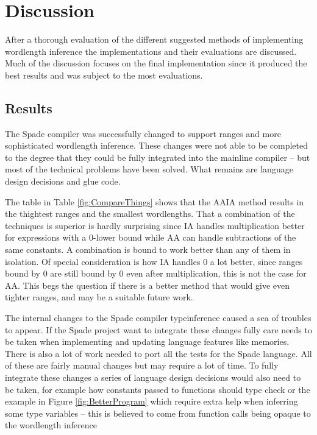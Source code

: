 \chapter{Discussion}
\label{cha:Discussion}
After a thorough evaluation of the different suggested methods of implementing wordlength inference the implementations and their evaluations are discussed. Much of the discussion focuses on the final implementation since it produced the best results and was subject to the most evaluations.

\section{Results}
The Spade compiler was successfully changed to support ranges and more sophisticated wordlength inference. These changes were not able to be completed to the degree that they could be fully integrated into the mainline compiler -- but most of the technical problems have been solved. What remains are language design decisions and glue code.

The table in Table \ref{fig:CompareThings} shows that the AAIA method results in the thightest ranges and the smallest wordlengths. That a combination of the techniques is superior is hardly surprising since IA handles multiplication better for expressions with a 0-lower bound while AA can handle subtractions of the same constants. A combination is bound to work better than any of them in isolation. Of special consideration is how IA handles $0$ a lot better, since ranges bound by 0 are still bound by $0$ even after multiplication, this is not the case for AA. This begs the question if there is a better method that would give even tighter ranges, and may be a suitable future work.

The internal changes to the Spade compiler typeinference caused a sea of troubles to appear. If the Spade project want to integrate these changes fully care needs to be taken when implementing and updating language features like memories. There is also a lot of work needed to port all the tests for the Spade language. All of these are fairly manual changes but may require a lot of time. To fully integrate these changes a series of language design decisions would also need to be taken, for example how constants passed to functions should type check or the example in Figure \ref{fig:BetterProgram} which require extra help when inferring some type variables -- this is believed to come from function calls being opaque to the wordlength inference

